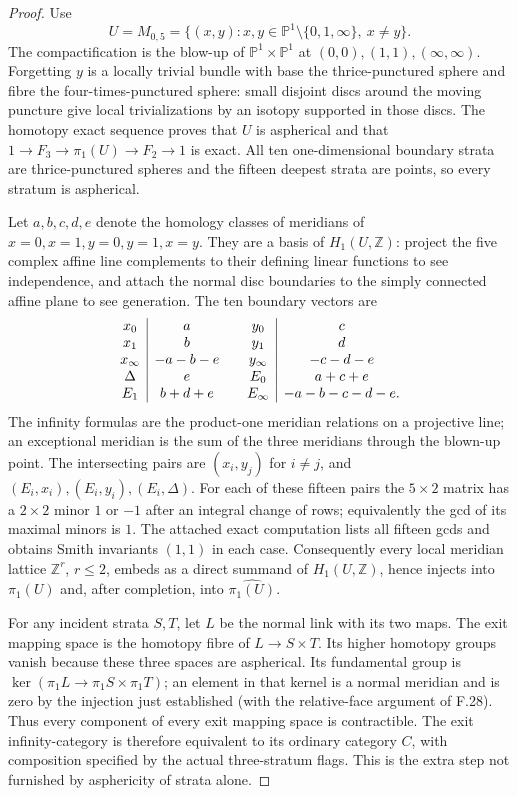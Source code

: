 \begin{proof}
Use
\[
 U=M_{0,5}=\{(x,y):x,y\in\mathbb P^1\setminus\{0,1,\infty\},\ x\ne y\}.
\]
The compactification is the blow-up of $\mathbb P^1\times\mathbb P^1$
at $(0,0),(1,1),(\infty,\infty)$. Forgetting $y$ is a locally trivial
bundle with base the thrice-punctured sphere and fibre the
four-times-punctured sphere: small disjoint discs around the moving
puncture give local trivializations by an isotopy supported in those
discs. The homotopy exact sequence proves that $U$ is aspherical and
that
$1\to F_3\to\pi_1(U)\to F_2\to1$ is exact. All ten one-dimensional
boundary strata are thrice-punctured spheres and the fifteen deepest
strata are points, so every stratum is aspherical.

Let $a,b,c,d,e$ denote the homology classes of meridians of
$x=0,x=1,y=0,y=1,x=y$. They are a basis of $H_1(U,\mathbb Z)$: project
the five complex affine line complements to their defining linear
functions to see independence, and attach the normal disc boundaries
to the simply connected affine plane to see generation. The ten
boundary vectors are
\[
\begin{array}{c|c@{\qquad}c|c}
x_0&a&y_0&c\\
x_1&b&y_1&d\\
x_\infty&-a-b-e&y_\infty&-c-d-e\\
\Delta&e&E_0&a+c+e\\
E_1&b+d+e&E_\infty&-a-b-c-d-e.
\end{array}
\]
The infinity formulas are the product-one meridian relations on a
projective line; an exceptional meridian is the sum of the three
meridians through the blown-up point. The intersecting pairs are
$(x_i,y_j)$ for $i\ne j$, and $(E_i,x_i),(E_i,y_i),(E_i,\Delta)$.
For each of these fifteen pairs the $5\times2$ matrix has a $2\times2$
minor $1$ or $-1$ after an integral change of rows; equivalently the gcd
of its maximal minors is $1$. The attached exact computation lists all
fifteen gcds and obtains Smith invariants $(1,1)$ in each case.
Consequently every local meridian lattice $\mathbb Z^r$, $r\le2$,
embeds as a direct summand of $H_1(U,\mathbb Z)$, hence injects into
$\pi_1(U)$ and, after completion, into $\widehat{\pi_1(U)}$.

For any incident strata $S,T$, let $L$ be the normal link with its two
maps. The exit mapping space is the homotopy fibre of
$L\to S\times T$. Its higher homotopy groups vanish because these
three spaces are aspherical. Its fundamental group is
$\ker(\pi_1L\to\pi_1S\times\pi_1T)$; an element in that kernel is a
normal meridian and is zero by the injection just established (with the
relative-face argument of F.28). Thus every component of every exit
mapping space is contractible. The exit infinity-category is therefore
equivalent to its ordinary category $C$, with composition specified by
the actual three-stratum flags. This is the extra step not furnished by
asphericity of strata alone.


\end{proof}
